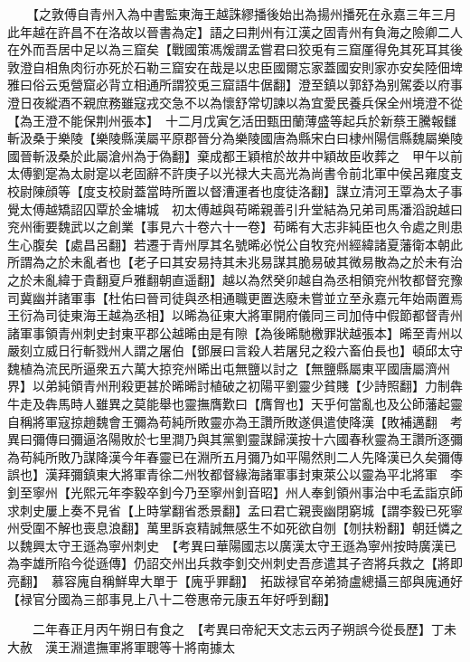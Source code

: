 　　【之敦傅自青州入為中書監東海王越誅繆播後始出為揚州播死在永嘉三年三月此年越在許昌不在洛故以晉書為定】語之曰荆州有江漢之固青州有負海之險卿二人在外而吾居中足以為三窟矣【戰國策馮煖謂孟嘗君曰狡兎有三窟厪得免其死耳其後敦澄自相魚肉衍亦死於石勒三窟安在哉是以忠臣國爾忘家蓋國安則家亦安矣陸佃埤雅曰俗云兎營窟必背立相通所謂狡兎三窟語牛倨翻】澄至鎮以郭舒為别駕委以府事澄日夜縱酒不親庶務雖寇戎交急不以為懷舒常切諫以為宜愛民養兵保全州境澄不從【為王澄不能保荆州張本】　十二月戊寅乞活田甄田蘭薄盛等起兵於新蔡王騰報讎斬汲桑于樂陵【樂陵縣漢屬平原郡晉分為樂陵國唐為縣宋白曰棣州陽信縣魏屬樂陵國晉斬汲桑於此屬滄州為于偽翻】棄成都王穎棺於故井中穎故臣收葬之　甲午以前太傅劉寔為太尉寔以老固辭不許庚子以光禄大夫高光為尚書令前北軍中侯呂雍度支校尉陳顔等【度支校尉蓋當時所置以督漕運者也度徒洛翻】謀立清河王覃為太子事覺太傅越矯詔囚覃於金墉城　初太傅越與苟晞親善引升堂結為兄弟司馬潘滔說越曰兖州衝要魏武以之創業【事見六十卷六十一卷】苟晞有大志非純臣也久令處之則患生心腹矣【處昌呂翻】若遷于青州厚其名號晞必悦公自牧兖州經緯諸夏藩衛本朝此所謂為之於未亂者也【老子曰其安易持其未兆易謀其脆易破其微易散為之於未有治之於未亂緯于貴翻夏戶雅翻朝直遥翻】越以為然癸卯越自為丞相領兖州牧都督兖豫司冀幽并諸軍事【杜佑曰晉司徒與丞相通職更置迭廢未嘗並立至永嘉元年始兩置焉王衍為司徒東海王越為丞相】以晞為征東大將軍開府儀同三司加侍中假節都督青州諸軍事領青州刺史封東平郡公越晞由是有隙【為後晞馳檄罪狀越張本】晞至青州以嚴刻立威日行斬戮州人謂之屠伯【鄧展曰言殺人若屠兒之殺六畜伯長也】頓邱太守魏植為流民所逼衆五六萬大掠兖州晞出屯無鹽以討之【無鹽縣屬東平國唐屬濟州界】以弟純領青州刑殺更甚於晞晞討植破之初陽平劉靈少貧賤【少詩照翻】力制犇牛走及犇馬時人雖異之莫能舉也靈撫膺歎曰【膺胷也】天乎何當亂也及公師藩起靈自稱將軍寇掠趙魏會王彌為苟純所敗靈亦為王讚所敗遂俱遣使降漢【敗補邁翻　考異曰彌傳曰彌逼洛陽敗於七里澗乃與其黨劉靈謀歸漢按十六國春秋靈為王讚所逐彌為苟純所敗乃謀降漢今年春靈已在淵所五月彌乃如平陽然則二人先降漢已久矣彌傳誤也】漢拜彌鎮東大將軍青徐二州牧都督緣海諸軍事封東萊公以靈為平北將軍　李釗至寧州【光熙元年李毅卒釗今乃至寧州釗音昭】州人奉釗領州事治中毛孟詣京師求刺史屢上奏不見省【上時掌翻省悉景翻】孟曰君亡親喪幽閉窮城【謂李毅已死寧州受圍不解也喪息浪翻】萬里訴哀精誠無感生不如死欲自刎【刎扶粉翻】朝廷憐之以魏興太守王遜為寧州刺史　【考異曰華陽國志以廣漢太守王遜為寧州按時廣漢已為李雄所陷今從遜傳】仍詔交州出兵救李釗交州刺史吾彦遣其子咨將兵救之【將即亮翻】　慕容廆自稱鮮卑大單于【廆乎罪翻】　拓跋禄官卒弟猗盧總攝三部與廆通好【禄官分國為三部事見上八十二卷惠帝元康五年好呼到翻】

　　二年春正月丙午朔日有食之　【考異曰帝紀天文志云丙子朔誤今從長歷】丁未大赦　漢王淵遣撫軍將軍聰等十將南據太

